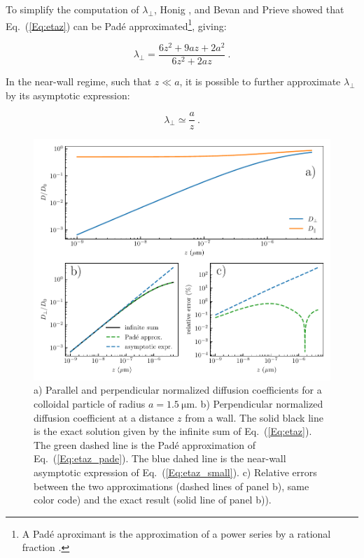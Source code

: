 To simplify the computation of $\lambda_\bot$, Honig \cite{honig_effect_1971}, and Bevan and Prieve \cite{bevan_hindered_2000} showed that Eq.~(\ref{Eq:etaz}) can be Padé approximated\footnote{A Padé aproximant is the approximation of a power series by a rational fraction \cite{baker_pade_1996}.}, giving:

\begin{equation}
	\lambda_\bot =  \frac{6z^2 + 9az + 2a^2}{6z^2 + 2az}~.
	\label{Eq:etaz_pade}
\end{equation}

In the near-wall regime, such that $z \ll a$, it is possible to further approximate $\lambda_\bot$ by its asymptotic expression:

\begin{equation}
	\lambda_\bot \simeq \frac{a}{z} ~.
	\label{Eq:etaz_small}
\end{equation}


\begin{figure}[H]
	\centering
	\includegraphics{02_body/chapter3/images/theory_lambda/hindered_diffusion.pdf}
	\caption{a)  Parallel and perpendicular normalized diffusion coefficients for a colloidal particle of radius $a = 1.5 ~ \mathrm{\mu m}$. b) Perpendicular normalized diffusion coefficient at a distance $z$ from a wall. The solid black line is the exact solution given by the infinite sum of Eq.~(\ref{Eq:etaz}). The green dashed line is the Padé approximation of Eq.~(\ref{Eq:etaz_pade}). The blue dahed line is the near-wall asymptotic expression of Eq.~(\ref{Eq:etaz_small}). c) Relative errors between the two approximations (dashed lines of panel b), same color code) and the exact result (solid line of panel b)).}
	\label{fig.etaz}
\end{figure}


